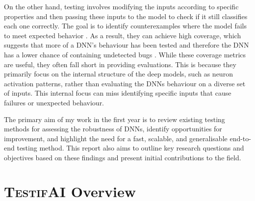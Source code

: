 On the other hand, testing involves modifying the inputs according to specific properties and then passing these inputs to the model to check if it still classifies each one correctly. The goal is to identify counterexamples where the model fails to meet expected behavior \cite{Rushby}. As a result, they can achieve high coverage, which suggests that more of a DNN's behaviour has been tested and therefore the DNN has a lower chance of containing undetected bugs \cite{HuangX}. While these coverage metrics are useful, they often fall short in providing \hyperref[gloss]{}\label{comprehensive} evaluations. This is because they primarily focus on the internal structure of the deep models, such as neuron activation patterns, rather than evaluating the DNNs behaviour on a diverse set of inputs. This internal focus can miss identifying specific inputs that cause failures or unexpected behaviour.


\begin{tcolorbox}[colback=purple!2!white, colframe=purple,title= 10\textsuperscript{th} Month Report Goal]

    The primary aim of my work in the first year is to review existing testing methods for assessing the robustness of DNNs, identify opportunities for improvement, and highlight the need for a fast, scalable, and generalisable end-to-end testing method. This report also aims to outline key research questions and objectives based on these findings and present initial contributions to the field.

\end{tcolorbox}



\section{\textsc{TestifAI} Overview}

